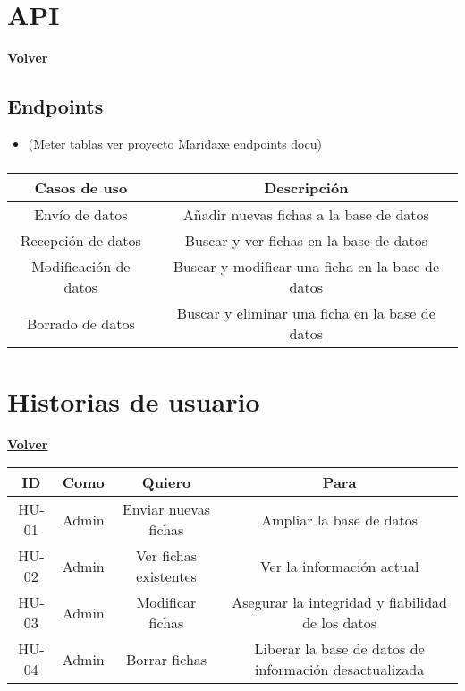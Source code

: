 \documentclass[a4paper,12pt]{article}
\begin{document}
\clearpage

\section{API}
\hyperlink{anchor-indice}{\textbf{Volver}}\\

\subsection{Endpoints}
\begin{itemize}
    \item (Meter tablas ver proyecto Maridaxe endpoints docu)
\end{itemize}

\subsubsection{}

\begin{tabular}{ |c|c| } 
 \hline
 \textbf{Casos de uso} & \textbf{Descripción} \\ 
 \hline
 Envío de datos & Añadir nuevas fichas a la base de datos\\ 
 \hline
 Recepción de datos & Buscar y ver fichas en la base de datos\\
 \hline
 Modificación de datos & Buscar y modificar una ficha en la base de datos\\
 \hline
 Borrado de datos & Buscar y eliminar una ficha en la base de datos\\
 \hline
\end{tabular}


\section{Historias de usuario}
\hyperlink{anchor-indice}{\textbf{Volver}}\\

\begin{tabular}{ |c|c|c|c| } 
 \hline
 \textbf{ID} & \textbf{Como} & \textbf{Quiero} & \textbf{Para} \\ 
 \hline
 HU-01 & Admin & Enviar nuevas fichas & Ampliar la base de datos\\ 
 \hline
 HU-02 & Admin & Ver fichas existentes & Ver la información actual\\
 \hline
 HU-03 & Admin & Modificar fichas & Asegurar la integridad y fiabilidad de los datos\\
 \hline
 HU-04 & Admin & Borrar fichas & Liberar la base de datos de información desactualizada\\
 \hline
\end{tabular}
\end{document}
